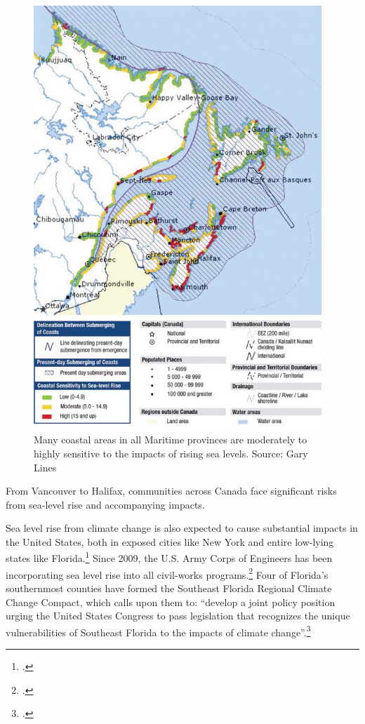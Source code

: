 \begin{figure}
\includegraphics[height=160mm]{s3-coastalsealevel.png}
\centering
\caption{Many coastal areas in all Maritime provinces are moderately to highly sensitive to the impacts of rising sea  levels. Source: Gary Lines}
\label{fig:s3-coastalsealevel}
\end{figure}



From Vancouver to Halifax, communities across Canada face significant risks from sea-level rise and accompanying impacts.



Sea level rise from climate change is also expected to cause substantial impacts in the United States, both in exposed cities like New York and entire low-lying states like Florida.\footcite[][]{EconGetWet}
Since 2009, the U.S. Army Corps of Engineers has been incorporating sea level rise into all civil-works programs.\footcite[][]{CorpsEngSeaLevel}
Four of Florida's southernmost counties have formed the Southeast Florida Regional Climate Change Compact, which calls upon them to: ``develop a joint policy position urging the United States Congress to pass legislation that recognizes the unique vulnerabilities of Southeast Florida to the impacts of climate change''.\footcite[][]{SouthEastFloridaCompact}



